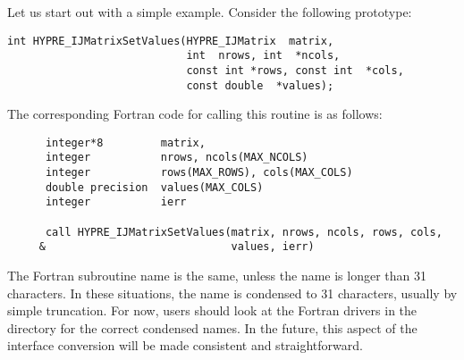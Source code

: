 Let us start out with a simple example.  Consider the following
\hypre{} prototype:
\begin{display}
\begin{verbatim}
int HYPRE_IJMatrixSetValues(HYPRE_IJMatrix  matrix,
                            int  nrows, int  *ncols,
                            const int *rows, const int  *cols,
                            const double  *values);
\end{verbatim}
\end{display}
The corresponding Fortran code for calling this routine is as follows:
\begin{display}
\begin{verbatim}
      integer*8         matrix, 
      integer           nrows, ncols(MAX_NCOLS)
      integer           rows(MAX_ROWS), cols(MAX_COLS)
      double precision  values(MAX_COLS)
      integer           ierr

      call HYPRE_IJMatrixSetValues(matrix, nrows, ncols, rows, cols,
     &                             values, ierr)
\end{verbatim}
\end{display}
The Fortran subroutine name is the same, unless the name is longer
than 31 characters.  In these situations, the name is condensed to 31
characters, usually by simple truncation.  For now, users should look
at the Fortran drivers in the  directory for the correct
condensed names.  In the future, this aspect of the interface conversion
will be made consistent and straightforward.

